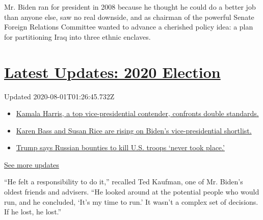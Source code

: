 Mr. Biden ran for president in 2008 because he thought he could do a
better job than anyone else, saw no real downside, and as chairman of
the powerful Senate Foreign Relations Committee wanted to advance a
cherished policy idea: a plan for partitioning Iraq into three ethnic
enclaves.

\hypertarget{latest-updates-2020-election}{%
\section{\texorpdfstring{\href{https://www.nytimes.com/2020/07/31/us/elections/biden-vs-trump.html?action=click\&pgtype=Article\&state=default\&region=MAIN_CONTENT_1\&context=storylines_live_updates}{Latest
Updates: 2020
Election}}{Latest Updates: 2020 Election}}\label{latest-updates-2020-election}}

Updated 2020-08-01T01:26:45.732Z

\begin{itemize}
\tightlist
\item
  \href{https://www.nytimes.com/2020/07/31/us/elections/biden-vs-trump.html?action=click\&pgtype=Article\&state=default\&region=MAIN_CONTENT_1\&context=storylines_live_updates\#link-29fdff45}{Kamala
  Harris, a top vice-presidential contender, confronts double
  standards.}
\item
  \href{https://www.nytimes.com/2020/07/31/us/elections/biden-vs-trump.html?action=click\&pgtype=Article\&state=default\&region=MAIN_CONTENT_1\&context=storylines_live_updates\#link-13ec3d9c}{Karen
  Bass and Susan Rice are rising on Biden's vice-presidential
  shortlist.}
\item
  \href{https://www.nytimes.com/2020/07/31/us/elections/biden-vs-trump.html?action=click\&pgtype=Article\&state=default\&region=MAIN_CONTENT_1\&context=storylines_live_updates\#link-49e9a016}{Trump
  says Russian bounties to kill U.S. troops `never took place.'}
\end{itemize}

\href{https://www.nytimes.com/2020/07/31/us/elections/biden-vs-trump.html?action=click\&pgtype=Article\&state=default\&region=MAIN_CONTENT_1\&context=storylines_live_updates}{See
more updates}

``He felt a responsibility to do it,'' recalled Ted Kaufman, one of Mr.
Biden's oldest friends and advisers. ``He looked around at the potential
people who would run, and he concluded, `It's my time to run.' It wasn't
a complex set of decisions. If he lost, he lost.''

